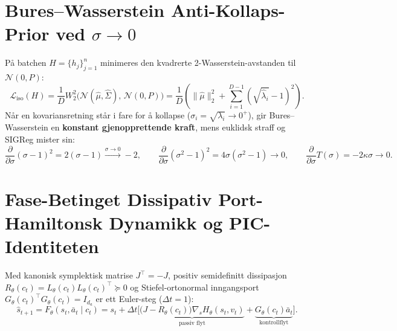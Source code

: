 \documentclass[11pt,a4paper,oneside]{book}
\theoremstyle{definition}
\begin{document}
\section{Bures--Wasserstein Anti-Kollaps-Prior ved $\sigma \to 0$}
På batchen $H = \{h_j\}_{j=1}^n$ minimeres den kvadrerte 2-Wasserstein-avstanden til $\mathcal{N}(0, P)$:
\begin{equation}
\mathcal{L}_{\text{iso}}(H) = \frac{1}{D}W_2^2\big(\mathcal{N}(\hat{\mu}, \hat{\Sigma}),\,\mathcal{N}(0, P)\big) = \frac{1}{D}\left(\|\hat{\mu}\|_2^2 + \sum_{i=1}^{D-1}\left(\sqrt{\hat{\lambda}_i} - 1\right)^2\right).
\end{equation}
Når en kovariansretning står i fare for å kollapse ($\sigma_i = \sqrt{\lambda_i} \to 0^+$), gir Bures--Wasserstein en \textbf{konstant gjenopprettende kraft}, mens euklidsk straff og SIGReg mister sin:
\begin{equation}
\boxed{\frac{\partial}{\partial\sigma}(\sigma - 1)^2 = 2(\sigma - 1) \xrightarrow{\sigma \to 0} -2, \qquad \frac{\partial}{\partial\sigma}(\sigma^2 - 1)^2 = 4\sigma(\sigma^2 - 1) \to 0, \qquad \frac{\partial}{\partial\sigma}T(\sigma) = -2\kappa\sigma \to 0.}
\end{equation}

\section{Fase-Betinget Dissipativ Port-Hamiltonsk Dynamikk og PIC-Identiteten}
Med kanonisk symplektisk matrise $J^\top = -J$, positiv semidefinitt dissipasjon $R_\theta(c_t) = L_\theta(c_t)L_\theta(c_t)^\top \succeq 0$ og Stiefel-ortonormal inngangsport $G_\theta(c_t)^\top G_\theta(c_t) = I_{d_a}$ er ett Euler-steg ($\Delta t = 1$):
\begin{equation}
\hat{s}_{t+1} = F_\theta(s_t, \bar{a}_t \mid c_t) = s_t + \Delta t\Big[\underbrace{\big(J - R_\theta(c_t)\big)\nabla_s H_\theta(s_t, v_t)}_{\text{passiv flyt}} + \underbrace{G_\theta(c_t)\bar{a}_t}_{\text{kontrollflyt}}\Big].
\end{equation}
\end{document}
